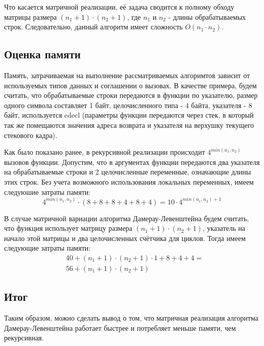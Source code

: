 Что касается матричной реализации, её задача сводится к полному обходу матрицы размера \((n_1+1)\cdot{}(n_2+1)\), где \(n_1\) и \(n_2\) - длины обрабатываемых строк. Следовательно, данный алгоритм имеет сложность \(O(n_1\cdot{}n_2)\).

\subsection{Оценка памяти}
Память, затрачиваемая на выполнение рассматриваемых алгоримтов зависит от используемых типов данных и соглашении о вызовах. В качестве примера, будем считать, что обрабатываемые строки передаются в функции по указателю, размер одного символа составляет 1 байт, целочисленного типа - 4 байта, указателя - 8 байт, используется cdecl (параметры функции передаются через стек, в который так же помещаются значения адреса возврата и указателя на верхушку текущего стекового кадра).

Как было показано ранее, в рекурсивной реализации происходит \(4^{min(n_1, n_2)}\) вызовов функции. Допустим, что в аргументах функции передаются два указателя на обрабатываемые строки и 2 целочисленные переменные, означающие длины этих строк. Без учета возможного использования локальных переменных, имеем следуюшие затраты памяти:
\begin{equation}
    4^{min(n_1, n_2)} \cdot{} (8+8 + 8+4 + 8+4) = 10 \cdot 4^{min(n_1, n_2) + 1}
\end{equation}

В случае матричной вариации алгоритма Дамерау-Левенштейна будем считать, что функция использует матрицу размера \((n_1+1)\cdot{}(n_2+1)\), указатель на начало этой матрицы и два целочисленных счётчика для циклов. Тогда имеем следующие затраты памяти:
\begin{equation}
    \begin{split}
    & 40 + (n_1+1)\cdot{}(n_2+1)\cdot{}1 + 8 + 4 + 4 = \\
    & 56 + (n_1+1)\cdot{}(n_2+1)
    \end{split}
\end{equation}

\subsection{Итог}
Таким образом, можно сделать вывод о том, что матричная реализация алгоритма Дамерау-Левенштейна работает быстрее и потребляет меньше памяти, чем рекурсивная.

